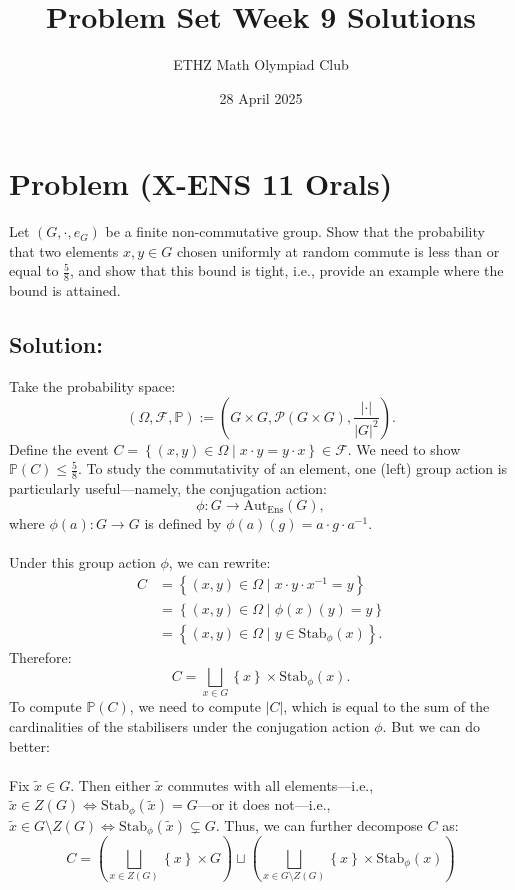 \documentclass[11pt, a4paper, oneside]{article}
\title{Problem Set Week 9 Solutions}
\author{ETHZ Math Olympiad Club}
\date{28 April 2025}
\newcommand{\problem}[1][]{\section{#1} \hfill \par}
\newcommand{\solution}[1][]{\subsection*{#1}\hfill \par}
\theoremstyle{remark}
\theoremstyle{lemma}
\begin{document}
\maketitle
\problem[Problem (X-ENS 11 Orals)]
Let \(\left(G,\cdot,e_G\right)\) be a finite non-commutative group. Show that the probability that two elements \(x,y\in G\) chosen uniformly at random commute is less than or equal to \(\frac{5}{8}\), and show that this bound is tight, i.e., provide an example where the bound is attained.

\solution[Solution:]
Take the probability space:
\[
\left(\Omega,\mathcal{F},\mathbb{P}\right) := \left(G\times G,\mathscr{P}(G\times G),\frac{|\cdot|}{|G|^2}\right).
\]
Define the event \(C = \left\{ \left(x,y\right)\in\Omega \mid x\cdot y = y\cdot x \right\} \in \mathcal{F}\). We need to show \(\mathbb{P}(C)\leq \frac{5}{8}\). To study the commutativity of an element, one (left) group action is particularly useful—namely, the conjugation action:
\[
\phi : G \longrightarrow \mathrm{Aut}_{\mathrm{Ens}}(G),
\]
where \( \phi(a) : G \longrightarrow G \) is defined by \( \phi(a)(g) = a \cdot g \cdot a^{-1} \).
\\\\
Under this group action \(\phi\), we can rewrite:
\begin{align*}
C &= \left\{ \left( x, y \right) \in \Omega \mid x \cdot y \cdot x^{-1} = y \right\} \nonumber \\
&= \left\{ \left( x, y \right) \in \Omega \mid \phi(x)(y) = y \right\} \nonumber \\
&= \left\{ \left( x, y \right) \in \Omega \mid y \in \mathrm{Stab}_{\phi}(x) \right\}.
\end{align*}
Therefore:
\[
C = \bigsqcup_{x\in G} \left\{ x \right\} \times \mathrm{Stab}_{\phi}(x).
\]
To compute \(\mathbb{P}(C)\), we need to compute \(|C|\), which is equal to the sum of the cardinalities of the stabilisers under the conjugation action \(\phi\). But we can do better:
\\\\
Fix \(\tilde{x}\in G\). Then either \(\tilde{x}\) commutes with all elements—i.e., \(\tilde{x}\in Z(G) \Leftrightarrow \mathrm{Stab}_{\phi}(\tilde{x}) = G\)—or it does not—i.e., \(\tilde{x}\in G \setminus Z(G) \Leftrightarrow \mathrm{Stab}_{\phi}(\tilde{x}) \subsetneq G\). Thus, we can further decompose \(C\) as:
\[
C = \left( \bigsqcup_{x\in Z(G)} \left\{ x \right\} \times G \right) \sqcup \left( \bigsqcup_{x\in G \setminus Z(G)} \left\{ x \right\} \times \mathrm{Stab}_{\phi}(x) \right)
\]
\end{document}
